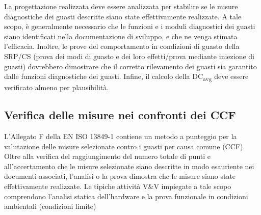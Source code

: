 La progettazione realizzata deve essere analizzata per stabilire se le misure diagnostiche dei guasti descritte siano state effettivamente realizzate. A tale scopo, è generalmente necessario che le funzioni e i moduli diagnostici dei guasti siano identificati nella documentazione di sviluppo, e che ne venga stimata l'efficacia. Inoltre, le prove del comportamento in condizioni di guasto della SRP/CS (prova dei modi di guasto e dei loro effetti/prova mediante iniezione di guasti) dovrebbero dimostrare che il corretto rilevamento dei guasti sia garantito dalle funzioni diagnostiche dei guasti. Infine, il calcolo della DC\textsubscript{avg} deve essere verificato almeno per plausibilità.

\subsection{Verifica delle misure nei confronti dei CCF}
\label{subsec:07-4-4}
L'Allegato F della EN ISO 13849-1 contiene un metodo a punteggio per la valutazione delle misure selezionate contro i guasti per causa comune (CCF). Oltre alla verifica del raggiungimento del numero totale di punti e all'accertamento che le misure selezionate siano descritte in modo esauriente nei documenti associati, l'analisi o la prova dimostra che le misure siano state effettivamente realizzate. Le tipiche attività V\&V impiegate a tale scopo comprendono l'analisi statica dell'hardware e la prova funzionale in condizioni ambientali (condizioni limite)

